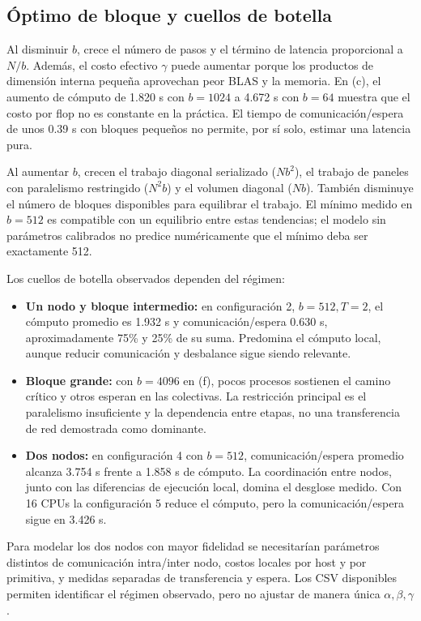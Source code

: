 \documentclass[
  spanish,
  11pt,
  a4paper,
]{article}
\providecommand{\tightlist}{%
  \setlength{\itemsep}{0pt}\setlength{\parskip}{0pt}}
\begin{document}
\subsection{Óptimo de bloque y cuellos de
botella}\label{uxf3ptimo-de-bloque-y-cuellos-de-botella}

Al disminuir \(b\), crece el número de pasos y el término de latencia
proporcional a \(N/b\). Además, el costo efectivo \(\gamma\) puede
aumentar porque los productos de dimensión interna pequeña aprovechan
peor BLAS y la memoria. En (c), el aumento de cómputo de 1.820 s con
\(b=1024\) a 4.672 s con \(b=64\) muestra que el costo por flop no es
constante en la práctica. El tiempo de comunicación/espera de unos 0.39
s con bloques pequeños no permite, por sí solo, estimar una latencia
pura.

Al aumentar \(b\), crecen el trabajo diagonal serializado (\(Nb^2\)), el
trabajo de paneles con paralelismo restringido (\(N^2b\)) y el volumen
diagonal (\(Nb\)). También disminuye el número de bloques disponibles
para equilibrar el trabajo. El mínimo medido en \(b=512\) es compatible
con un equilibrio entre estas tendencias; el modelo sin parámetros
calibrados no predice numéricamente que el mínimo deba ser exactamente
512.

Los cuellos de botella observados dependen del régimen:

\begin{itemize}
\tightlist
\item
  \textbf{Un nodo y bloque intermedio:} en configuración 2,
  \(b=512,T=2\), el cómputo promedio es 1.932 s y comunicación/espera
  0.630 s, aproximadamente 75\% y 25\% de su suma. Predomina el cómputo
  local, aunque reducir comunicación y desbalance sigue siendo
  relevante.
\item
  \textbf{Bloque grande:} con \(b=4096\) en (f), pocos procesos
  sostienen el camino crítico y otros esperan en las colectivas. La
  restricción principal es el paralelismo insuficiente y la dependencia
  entre etapas, no una transferencia de red demostrada como dominante.
\item
  \textbf{Dos nodos:} en configuración 4 con \(b=512\),
  comunicación/espera promedio alcanza 3.754 s frente a 1.858 s de
  cómputo. La coordinación entre nodos, junto con las diferencias de
  ejecución local, domina el desglose medido. Con 16 CPUs la
  configuración 5 reduce el cómputo, pero la comunicación/espera sigue
  en 3.426 s.
\end{itemize}

Para modelar los dos nodos con mayor fidelidad se necesitarían
parámetros distintos de comunicación intra/inter nodo, costos locales
por host y por primitiva, y medidas separadas de transferencia y espera.
Los CSV disponibles permiten identificar el régimen observado, pero no
ajustar de manera única \(\alpha,\beta,\gamma\).
\end{document}
